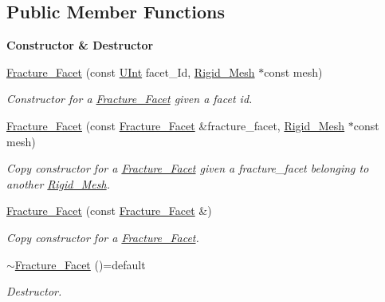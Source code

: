 \subsection*{Public Member Functions}
\begin{Indent}{\bf Constructor \& Destructor}\par
\begin{DoxyCompactItemize}
\item 
\hyperlink{classFVCode3D_1_1Rigid__Mesh_1_1Fracture__Facet_a206a35c6464cbc525ff3c76c7051c226}{Fracture\+\_\+\+Facet} (const \hyperlink{namespaceFVCode3D_a4bf7e328c75d0fd504050d040ebe9eda}{U\+Int} facet\+\_\+\+Id, \hyperlink{classFVCode3D_1_1Rigid__Mesh}{Rigid\+\_\+\+Mesh} $\ast$const mesh)
\begin{DoxyCompactList}\small\item\em Constructor for a \hyperlink{classFVCode3D_1_1Rigid__Mesh_1_1Fracture__Facet}{Fracture\+\_\+\+Facet} given a facet id. \end{DoxyCompactList}\item 
\hyperlink{classFVCode3D_1_1Rigid__Mesh_1_1Fracture__Facet_abe98490b887bd620c0704f000e4f113b}{Fracture\+\_\+\+Facet} (const \hyperlink{classFVCode3D_1_1Rigid__Mesh_1_1Fracture__Facet}{Fracture\+\_\+\+Facet} \&fracture\+\_\+facet, \hyperlink{classFVCode3D_1_1Rigid__Mesh}{Rigid\+\_\+\+Mesh} $\ast$const mesh)
\begin{DoxyCompactList}\small\item\em Copy constructor for a \hyperlink{classFVCode3D_1_1Rigid__Mesh_1_1Fracture__Facet}{Fracture\+\_\+\+Facet} given a fracture\+\_\+facet belonging to another \hyperlink{classFVCode3D_1_1Rigid__Mesh}{Rigid\+\_\+\+Mesh}. \end{DoxyCompactList}\item 
\hyperlink{classFVCode3D_1_1Rigid__Mesh_1_1Fracture__Facet_a9a51c22a69010cfc99cba80ac1bffa58}{Fracture\+\_\+\+Facet} (const \hyperlink{classFVCode3D_1_1Rigid__Mesh_1_1Fracture__Facet}{Fracture\+\_\+\+Facet} \&)
\begin{DoxyCompactList}\small\item\em Copy constructor for a \hyperlink{classFVCode3D_1_1Rigid__Mesh_1_1Fracture__Facet}{Fracture\+\_\+\+Facet}. \end{DoxyCompactList}\item 
\hyperlink{classFVCode3D_1_1Rigid__Mesh_1_1Fracture__Facet_a7447b8424128b058b9c20d789d32f57a}{$\sim$\+Fracture\+\_\+\+Facet} ()=default
\begin{DoxyCompactList}\small\item\em Destructor. \end{DoxyCompactList}\end{DoxyCompactItemize}
\end{Indent}
